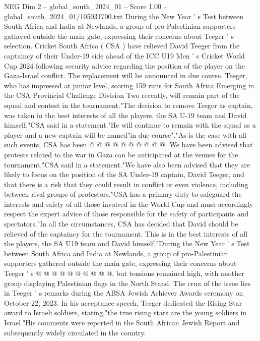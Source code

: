 \begin{textsample}{NEG Dim 2 – global\_south\_2024\_01 – Score 1.00 – global\_south\_2024\_01/105031700.txt}  \label{ex:f2_neg_350}
During the New Year ' s Test between South Africa and India at Newlands, a group of pro-Palestinian supporters gathered outside the main gate, expressing their concerns about Teeger ' s selection.
Cricket South Africa ( CSA ) have relieved David Teeger from the captaincy of their Under-19 side ahead of the ICC U19 Men ' s Cricket World Cup 2024 following security advice regarding the position of the player on the Gaza-Israel conflict.
The replacement will be announced in due course.
Teeger, who has impressed at junior level, scoring 159 runs for South Africa Emerging in the CSA Provincial Challenge Division Two recently, will remain part of the squad and contest in the tournament."The decision to remove Teeger as captain, was taken in the best interests of all the players, the SA U-19 team and David himself,"CSA said in a statement."He will continue to remain with the squad as a player and a new captain will be named"in due course"."As is the case with all such events, CSA has been @ @ @ @ @ @ @ @ @ @.
We have been advised that protests related to the war in Gaza can be anticipated at the venues for the tournament,"CSA said in a statement."We have also been advised that they are likely to focus on the position of the SA Under-19 captain, David Teeger, and that there is a risk that they could result in conflict or even violence, including between rival groups of protestors."CSA has a primary duty to safeguard the interests and safety of all those involved in the World Cup and must accordingly respect the expert advice of those responsible for the safety of participants and spectators."In all the circumstances, CSA has decided that David should be relieved of the captaincy for the tournament.
This is in the best interests of all the players, the SA U19 team and David himself."During the New Year ' s Test between South Africa and India at Newlands, a group of pro-Palestinian supporters gathered outside the main gate, expressing their concerns about Teeger ' s @ @ @ @ @ @ @ @ @ @, but tensions remained high, with another group displaying Palestinian flags in the North Stand.
The crux of the issue lies in Teeger ' s remarks during the ABSA Jewish Achiever Awards ceremony on October 22, 2023.
In his acceptance speech, Teeger dedicated the Rising Star award to Israeli soldiers, stating,"the true rising stars are the young soldiers in Israel."His comments were reported in the South African Jewish Report and subsequently widely circulated in the country.

\end{textsample}
